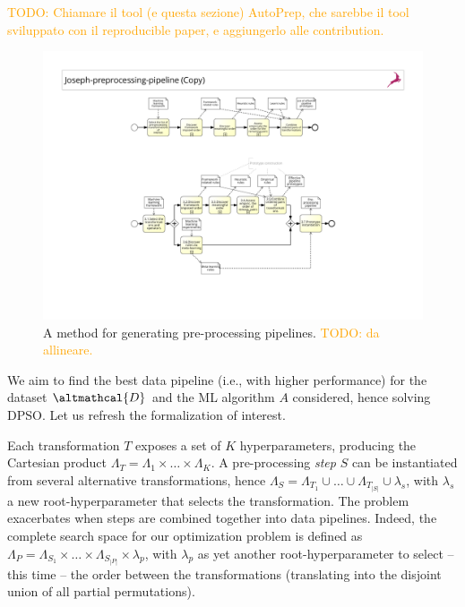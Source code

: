 \textcolor{orange}{TODO: Chiamare il tool (e questa sezione) AutoPrep, che sarebbe il tool sviluppato con il reproducible paper, e aggiungerlo alle contribution.}

\begin{figure}[t]
    \centering
    \includegraphics[clip, trim=6.5cm 3.5cm 6.5cm 8cm,width=1.0\textwidth]{chapters/data-centric/supervised/img/bpmn.pdf}
    \caption{A method for generating pre-processing pipelines. \textcolor{orange}{TODO: da allineare.}}
    \label{effective-fig:methodology}
\end{figure}


We aim to find the best data pipeline (i.e., with higher performance) for the dataset $\altmathcal{D}$ and the ML algorithm $A$ considered, hence solving DPSO.
Let us refresh the formalization of interest.

Each transformation $T$ exposes a set of $K$ hyperparameters, producing the Cartesian product $\Lambda_T = \Lambda_1 \times \dots \times \Lambda_K$.
A pre-processing \textit{step} $S$ can be instantiated from several alternative transformations, hence $\Lambda_S = \Lambda_{T_1} \cup \ldots \cup \Lambda_{T_{|S|}} \cup \lambda_s$, with $\lambda_s$ a new root-hyperparameter that selects the transformation.
The problem exacerbates when steps are combined together into data pipelines.
Indeed, the complete search space for our optimization problem is defined as $\Lambda_P = \Lambda_{S_1} \times \ldots \times \Lambda_{S_{|P|}} \times \lambda_p$, with $\lambda_p$ as yet another root-hyperparameter to select -- this time -- the order between the transformations (translating into the disjoint union of all partial permutations).

